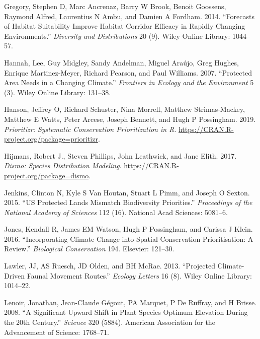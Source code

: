 \documentclass[]{article}
\begin{document}
\leavevmode\hypertarget{ref-gregory2014forecasts}{}%
Gregory, Stephen D, Marc Ancrenaz, Barry W Brook, Benoit Goossens, Raymond Alfred, Laurentius N Ambu, and Damien A Fordham. 2014. ``Forecasts of Habitat Suitability Improve Habitat Corridor Efficacy in Rapidly Changing Environments.'' \emph{Diversity and Distributions} 20 (9). Wiley Online Library: 1044--57.

\leavevmode\hypertarget{ref-hannah2007protected}{}%
Hannah, Lee, Guy Midgley, Sandy Andelman, Miguel Araújo, Greg Hughes, Enrique Martinez-Meyer, Richard Pearson, and Paul Williams. 2007. ``Protected Area Needs in a Changing Climate.'' \emph{Frontiers in Ecology and the Environment} 5 (3). Wiley Online Library: 131--38.

\leavevmode\hypertarget{ref-Hanson2019}{}%
Hanson, Jeffrey O, Richard Schuster, Nina Morrell, Matthew Strimas-Mackey, Matthew E Watts, Peter Arcese, Joseph Bennett, and Hugh P Possingham. 2019. \emph{Prioritizr: Systematic Conservation Prioritization in R}. \url{https://CRAN.R-project.org/package=prioritizr}.

\leavevmode\hypertarget{ref-Hijmans_Dismo}{}%
Hijmans, Robert J., Steven Phillips, John Leathwick, and Jane Elith. 2017. \emph{Dismo: Species Distribution Modeling}. \url{https://CRAN.R-project.org/package=dismo}.

\leavevmode\hypertarget{ref-jenkins2015us}{}%
Jenkins, Clinton N, Kyle S Van Houtan, Stuart L Pimm, and Joseph O Sexton. 2015. ``US Protected Lands Mismatch Biodiversity Priorities.'' \emph{Proceedings of the National Academy of Sciences} 112 (16). National Acad Sciences: 5081--6.

\leavevmode\hypertarget{ref-jones2016incorporating}{}%
Jones, Kendall R, James EM Watson, Hugh P Possingham, and Carissa J Klein. 2016. ``Incorporating Climate Change into Spatial Conservation Prioritisation: A Review.'' \emph{Biological Conservation} 194. Elsevier: 121--30.

\leavevmode\hypertarget{ref-lawler2013projected}{}%
Lawler, JJ, AS Ruesch, JD Olden, and BH McRae. 2013. ``Projected Climate-Driven Faunal Movement Routes.'' \emph{Ecology Letters} 16 (8). Wiley Online Library: 1014--22.

\leavevmode\hypertarget{ref-lenoir2008significant}{}%
Lenoir, Jonathan, Jean-Claude Gégout, PA Marquet, P De Ruffray, and H Brisse. 2008. ``A Significant Upward Shift in Plant Species Optimum Elevation During the 20th Century.'' \emph{Science} 320 (5884). American Association for the Advancement of Science: 1768--71.
\end{document}
